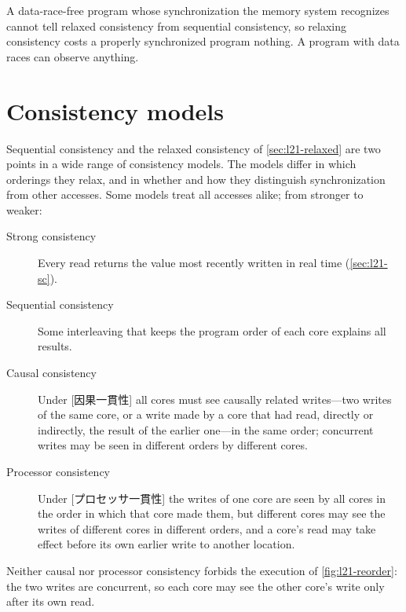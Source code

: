 \documentclass[../main.tex]{subfiles}
\begin{document}
\begin{keypoint}
  A data-race-free program whose synchronization the memory system recognizes
  cannot tell relaxed consistency from sequential consistency, so relaxing
  consistency costs a properly synchronized program nothing.  A program with
  data races can observe anything.
\end{keypoint}

\section{Consistency models}
\label{sec:l21-models}

Sequential consistency and the relaxed consistency of \cref{sec:l21-relaxed}
are two points in a wide range of consistency models.  The models differ in which orderings they
relax, and in whether and how they distinguish synchronization from other
accesses.  Some models treat all accesses alike; from stronger to weaker:
\begin{description}
  \item[Strong consistency] Every read returns the value most recently written
    in real time (\cref{sec:l21-sc}).
  \item[Sequential consistency] Some interleaving that keeps the program order
    of each core explains all results.
  \item[Causal consistency] Under [因果一貫性] all
    cores must see causally related writes---two writes of the same core, or a
    write made by a core that had read, directly or indirectly, the result of
    the earlier one---in the same order; concurrent writes may be seen in
    different orders by different cores.
  \item[Processor consistency] Under [プロセッサ一貫性] the writes of one core are seen by all
    cores in the order in which that core made them, but
    different cores may see the writes of different cores in different orders,
    and a core's read may take effect before its own earlier write to another
    location.
\end{description}
Neither causal nor processor consistency forbids the execution of
\cref{fig:l21-reorder}: the two writes are concurrent, so each core may see
the other core's write only after its own read.
\end{document}
